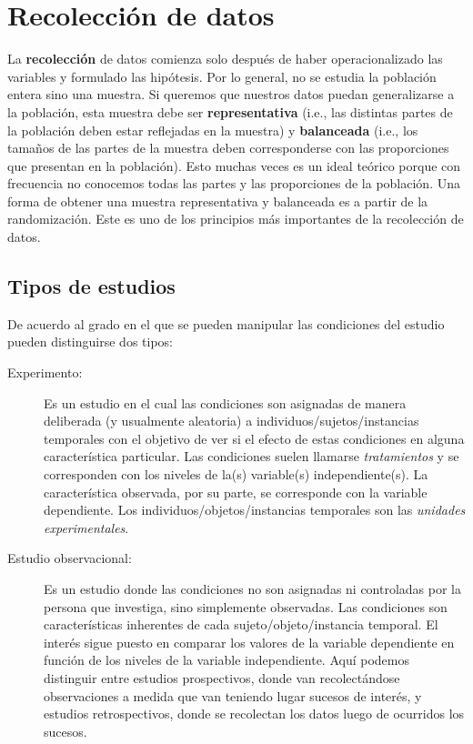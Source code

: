 \documentclass[authoryear,a4paper, 14pt]{scrartcl}
\begin{document}
\hypertarget{recoleccion-de-datos}{%
\section{Recolección de datos}\label{recoleccion-de-datos}}

La \textbf{recolección} de datos comienza solo después de haber
operacionalizado las variables y formulado las hipótesis. Por lo
general, no se estudia la población entera sino una muestra. Si queremos
que nuestros datos puedan generalizarse a la población, esta muestra
debe ser \textbf{representativa} (i.e., las distintas partes de la
población deben estar reflejadas en la muestra) y \textbf{balanceada}
(i.e., los tamaños de las partes de la muestra deben corresponderse con
las proporciones que presentan en la población). Esto muchas veces es un
ideal teórico porque con frecuencia no conocemos todas las partes y las
proporciones de la población. Una forma de obtener una muestra
representativa y balanceada es a partir de la randomización. Este es uno
de los principios más importantes de la recolección de datos.


\subsection{Tipos de estudios}

De acuerdo al grado en el que se pueden manipular las condiciones del estudio pueden distinguirse dos tipos: 

\begin{description}
    \item[\small{Experimento:}]
        Es un estudio en el cual las condiciones son asignadas de manera deliberada (y usualmente aleatoria) a individuos/sujetos/instancias temporales con el objetivo de ver si el efecto de estas condiciones en alguna característica particular. Las condiciones suelen llamarse \emph{tratamientos} y se corresponden con los niveles de la(s) variable(s) independiente(s). La característica observada, por su parte, se corresponde con la variable dependiente. Los individuos/objetos/instancias temporales son las \emph{unidades experimentales}.
    \item[\small{Estudio observacional:}]
        Es un estudio donde las condiciones no son asignadas ni controladas por la persona que investiga, sino simplemente observadas. Las condiciones son características inherentes de cada sujeto/objeto/instancia temporal. El interés sigue puesto en comparar los valores de la variable dependiente en función de los niveles de la variable independiente. Aquí podemos distinguir entre estudios prospectivos, donde van recolectándose observaciones a medida que van teniendo lugar sucesos de interés, y estudios retrospectivos, donde se recolectan los datos luego de ocurridos los sucesos.
\end{description}
\end{document}
